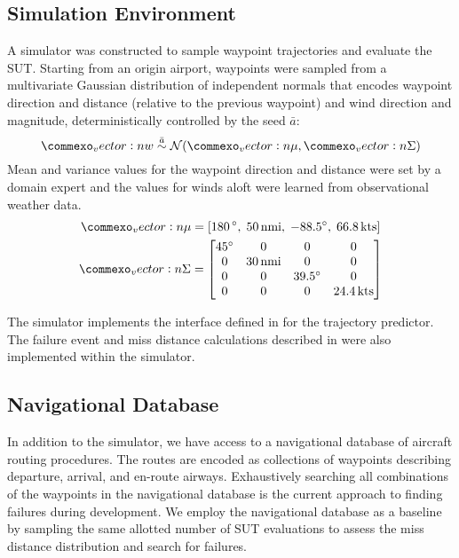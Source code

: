 
\subsection{Simulation Environment}
A simulator was constructed to sample waypoint trajectories and evaluate the SUT.
Starting from an origin airport, waypoints were sampled from a multivariate Gaussian distribution of independent normals that encodes waypoint direction and distance (relative to the previous waypoint) and wind direction and magnitude, deterministically controlled by the seed $\bar{a}$:
\begin{equation}
  \vec{w} \overset{\bar{a}}{\sim} \Normal(\vec{\mu}, \vec{\Sigma})
\end{equation}
Mean and variance values for the waypoint direction and distance were set by a domain expert and the values for winds aloft were learned from observational weather data.
\begin{gather*}
\vec{\mu} = \left[180\,\si{\degree},\; 50\,\si{nmi},\; -88.5\si{\degree},\; 66.8\,\si{kts}\right]\\
\mat{\Sigma} = \begin{bmatrix}
45\si{\degree} & 0 & 0 & 0\\
0 & 30\,\si{nmi} & 0 & 0\\
0 & 0 & 39.5\si{\degree} & 0\\
0 & 0 & 0 & 24.4\,\si{kts}
\end{bmatrix}
\end{gather*}

The simulator implements the interface defined in  for the trajectory predictor.
The failure event and miss distance calculations described in  were also implemented within the simulator.

\subsection{Navigational Database}
In addition to the simulator, we have access to a navigational database of aircraft routing procedures.
The routes are encoded as collections of waypoints describing departure, arrival, and en-route airways.
Exhaustively searching all combinations of the waypoints in the navigational database is the current approach to finding failures during development.
We employ the navigational database as a baseline by sampling the same allotted number of SUT evaluations to assess the miss distance distribution and search for failures.



